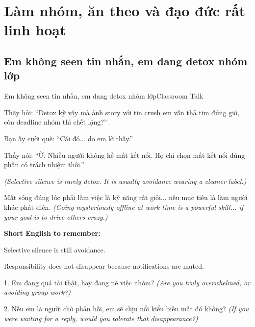 \chapter{Làm nhóm, ăn theo và đạo đức rất linh hoạt}

\section{Em không seen tin nhắn, em đang detox nhóm lớp}
\begin{truyen}{Em không seen tin nhắn, em đang detox nhóm lớp}{Classroom Talk}

Thầy hỏi: ``Detox kỹ vậy mà ảnh story với tin crush em vẫn thả tim đúng giờ, còn deadline nhóm thì chết lặng?''

Bạn ấy cười quê: ``Cái đó... do em lỡ thấy.''

Thầy nói: ``Ừ. Nhiều người không hề mất kết nối. Họ chỉ chọn mất kết nối đúng phần có trách nhiệm thôi.''

\textit{(Selective silence is rarely detox. It is usually avoidance wearing a cleaner label.)}
\end{truyen}

\begin{baihoc}
Mất sóng đúng lúc phải làm việc là kỹ năng rất giỏi... nếu mục tiêu là làm người khác phát điên.
\textit{(Going mysteriously offline at work time is a powerful skill... if your goal is to drive others crazy.)}
\end{baihoc}

\begin{ghinhoanh}
\textbf{Short English to remember:}

Selective silence is still avoidance.

Responsibility does not disappear because notifications are muted.
\end{ghinhoanh}

\begin{tuhocnhanh}
1. Em đang quá tải thật, hay đang né việc nhóm? \textit{(Are you truly overwhelmed, or avoiding group work?)}

2. Nếu em là người chờ phản hồi, em sẽ chịu nổi kiểu biến mất đó không? \textit{(If you were waiting for a reply, would you tolerate that disappearance?)}
\end{tuhocnhanh}
\ngancach

